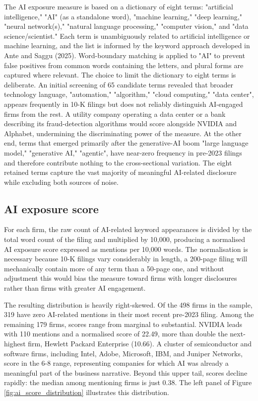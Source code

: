 \documentclass[12pt,a4paper]{article}
\begin{document}
The AI exposure measure is based on a dictionary of eight terms: "artificial intelligence," "AI" (as a standalone word), "machine learning," "deep learning," "neural network(s)," "natural language processing," "computer vision," and "data science/scientist." Each term is unambiguously related to artificial intelligence or machine learning, and the list is informed by the keyword approach developed in Ante and Saggu (2025). Word-boundary matching is applied to "AI" to prevent false positives from common words containing the letters, and plural forms are captured where relevant. The choice to limit the dictionary to eight terms is deliberate. An initial screening of 65 candidate terms revealed that broader technology language, "automation," "algorithm," "cloud computing," "data center", appears frequently in 10-K filings but does not reliably distinguish AI-engaged firms from the rest. A utility company operating a data center or a bank describing its fraud-detection algorithms would score alongside NVIDIA and Alphabet, undermining the discriminating power of the measure. At the other end, terms that emerged primarily after the generative-AI boom  "large language model," "generative AI," "agentic", have near-zero frequency in pre-2023 filings and therefore contribute nothing to the cross-sectional variation. The eight retained terms capture the vast majority of meaningful AI-related disclosure while excluding both sources of noise.

\subsection{AI exposure score}

For each firm, the raw count of AI-related keyword appearances is divided by the total word count of the filing and multiplied by 10,000, producing a normalised AI exposure score expressed as mentions per 10,000 words. The normalisation is necessary because 10-K filings vary considerably in length, a 200-page filing will mechanically contain more of any term than a 50-page one, and without adjustment this would bias the measure toward firms with longer disclosures rather than firms with greater AI engagement.

The resulting distribution is heavily right-skewed. Of the 498 firms in the sample, 319 have zero AI-related mentions in their most recent pre-2023 filing. Among the remaining 179 firms, scores range from marginal to substantial. NVIDIA leads with 110 mentions and a normalised score of 22.49, more than double the next-highest firm, Hewlett Packard Enterprise (10.66). A cluster of semiconductor and software firms, including Intel, Adobe, Microsoft, IBM, and Juniper Networks, score in the 6-8 range, representing companies for which AI was already a meaningful part of the business narrative. Beyond this upper tail, scores decline rapidly: the median among mentioning firms is just 0.38. The left panel of Figure \ref{fig:ai_score_distribution} illustrates this distribution.
\end{document}
